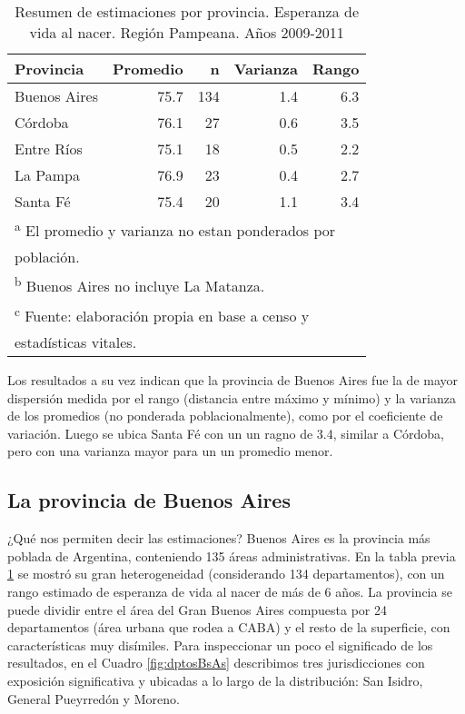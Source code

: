 \documentclass[12pt,spanish,]{article}
\begin{document}
\begin{table}

\caption{\label{tab:dispersion}Resumen de estimaciones por provincia. Esperanza de vida al nacer. Región Pampeana. Años 2009-2011}
\centering
\begin{tabular}[t]{lrrrr}
\toprule
Provincia & Promedio & n & Varianza & Rango\\
\midrule
Buenos Aires & 75.7 & 134 & 1.4 & 6.3\\
Córdoba & 76.1 & 27 & 0.6 & 3.5\\
Entre Ríos & 75.1 & 18 & 0.5 & 2.2\\
La Pampa & 76.9 & 23 & 0.4 & 2.7\\
Santa Fé & 75.4 & 20 & 1.1 & 3.4\\
\bottomrule
\multicolumn{5}{l}{\textsuperscript{a} El promedio y varianza no estan ponderados por}\\
\multicolumn{5}{l}{población.}\\
\multicolumn{5}{l}{\textsuperscript{b} Buenos Aires no incluye La Matanza.}\\
\multicolumn{5}{l}{\textsuperscript{c} Fuente: elaboración propia en base a censo y}\\
\multicolumn{5}{l}{estadísticas vitales.}\\
\end{tabular}
\end{table}

Los resultados a su vez indican que la provincia de Buenos Aires fue la
de mayor dispersión medida por el rango (distancia entre máximo y
mínimo) y la varianza de los promedios (no ponderada poblacionalmente),
como por el coeficiente de variación. Luego se ubica Santa Fé con un un
ragno de 3.4, similar a Córdoba, pero con una varianza mayor para un un
promedio menor.

\hypertarget{la-provincia-de-buenos-aires}{%
\subsection{La provincia de Buenos
Aires}\label{la-provincia-de-buenos-aires}}

¿Qué nos permiten decir las estimaciones? Buenos Aires es la provincia
más poblada de Argentina, conteniendo 135 áreas administrativas. En la
tabla previa \ref{tab:dispersion} se mostró su gran heterogeneidad
(considerando 134 departamentos), con un rango estimado de esperanza de
vida al nacer de más de 6 años. La provincia se puede dividir entre el
área del Gran Buenos Aires compuesta por 24 departamentos (área urbana
que rodea a CABA) y el resto de la superficie, con características muy
disímiles. Para inspeccionar un poco el significado de los resultados,
en el Cuadro \ref{fig:dptosBsAs} describimos tres jurisdicciones con
exposición significativa y ubicadas a lo largo de la distribución: San
Isidro, General Pueyrredón y Moreno.
\end{document}
